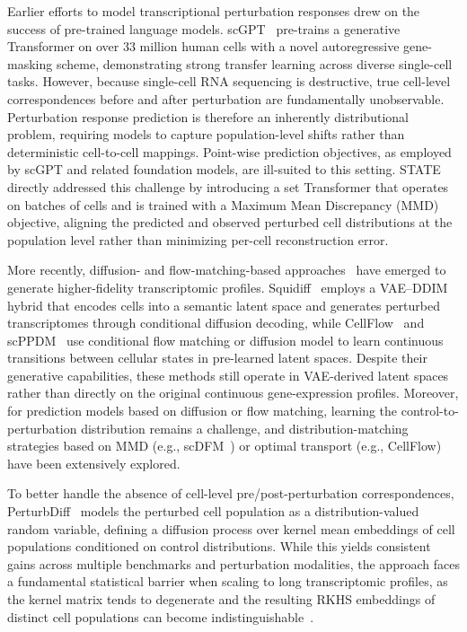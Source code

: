 \documentclass[11pt]{article}
\begin{document}
Earlier efforts to model transcriptional perturbation responses drew on the success of pre-trained language models. scGPT~\cite{cui2024scgpt} pre-trains a generative Transformer on over 33 million human cells with a novel autoregressive gene-masking scheme, demonstrating strong transfer learning across diverse single-cell tasks. However, because single-cell RNA sequencing is destructive, true cell-level correspondences before and after perturbation are fundamentally unobservable. Perturbation response prediction is therefore an inherently distributional problem, requiring models to capture population-level shifts rather than deterministic cell-to-cell mappings. Point-wise prediction objectives, as employed by scGPT and related foundation models, are ill-suited to this setting. STATE~\cite{adduri2025state} directly addressed this challenge by introducing a set Transformer that operates on batches of cells and is trained with a Maximum Mean Discrepancy (MMD) objective, aligning the predicted and observed perturbed cell distributions at the population level rather than minimizing per-cell reconstruction error.

More recently, diffusion- and flow-matching-based approaches~\cite{ho2020ddpm,lipman2023flow} have emerged to generate higher-fidelity transcriptomic profiles. Squidiff~\cite{he2025squidiff} employs a VAE--DDIM hybrid that encodes cells into a semantic latent space and generates perturbed transcriptomes through conditional diffusion decoding, while CellFlow~\cite{klein2025cellflow} and scPPDM~\cite{liang2025scppdm} use conditional flow matching or diffusion model to learn continuous transitions between cellular states in pre-learned latent spaces. Despite their generative capabilities, these methods still operate in VAE-derived latent spaces rather than directly on the original continuous gene-expression profiles. Moreover, for prediction models based on diffusion or flow matching, learning the control-to-perturbation distribution remains a challenge, and distribution-matching strategies based on MMD (e.g., scDFM~\cite{yu2026scdfm}) or optimal transport (e.g., CellFlow) have been extensively explored.

To better handle the absence of cell-level pre/post-perturbation correspondences, PerturbDiff~\cite{yuan2026perturbdiff} models the perturbed cell population as a distribution-valued random variable, defining a diffusion process over kernel mean embeddings of cell populations conditioned on control distributions. While this yields consistent gains across multiple benchmarks and perturbation modalities, the approach faces a fundamental statistical barrier when scaling to long transcriptomic profiles, as the kernel matrix tends to degenerate and the resulting RKHS embeddings of distinct cell populations can become indistinguishable~\cite{ramdas2015decreasing}.
\end{document}
